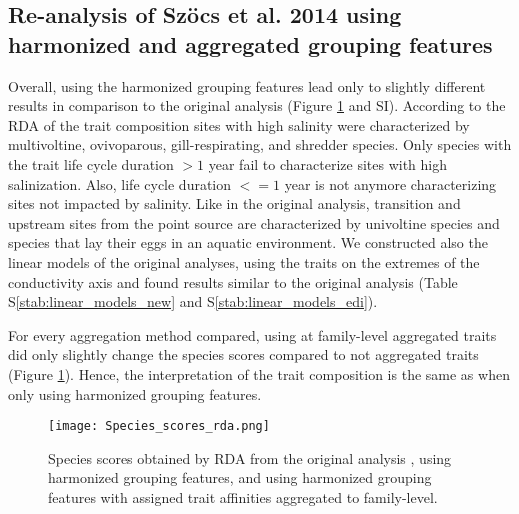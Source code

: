 \documentclass[../Draft_harmonization_paper.tex]{subfiles}
\begin{document}

\subsection*{Re-analysis of Szöcs et al. 2014 using harmonized and aggregated grouping features}

Overall, using the harmonized grouping features lead only to slightly different results in comparison to the original analysis (Figure \ref{fig:rda_species_scores} and SI). According to the RDA of the trait composition sites with high salinity were characterized by multivoltine, ovivoparous, gill-respirating, and shredder species. Only species with the trait life cycle duration $> 1$ year fail to characterize sites with high salinization. Also, life cycle duration $<= 1$ year is not anymore characterizing sites not impacted by salinity. Like in the original analysis, transition and upstream sites from the point source are characterized by univoltine species and species that lay their eggs in an aquatic environment. We constructed also the linear models of the original analyses, using the traits on the extremes of the conductivity axis and found results similar to the original analysis (Table S\ref{stab:linear_models_new} and S\ref{stab:linear_models_edi}).

For every aggregation method compared, using at family-level aggregated traits did only slightly change the species scores compared to not aggregated traits (Figure \ref{fig:rda_species_scores}). Hence, the interpretation of the trait composition is the same as when only using harmonized grouping features. 
 

\begin{figure}[H]
    \label{fig:rda_species_scores}
    \centering
    \texttt{[image: Species\_scores\_rda.png]}
    \caption{Species scores obtained by RDA from the original analysis \cite{szocs_effects_2014}, using harmonized grouping features, and using harmonized grouping features with assigned trait affinities aggregated to family-level.}
    \label{fig:rda_species_scores}
\end{figure}
\end{document}
